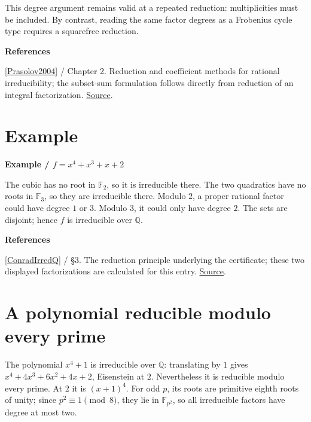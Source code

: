 \documentclass[11pt,a4paper,oneside,openany]{book}
\newcommand{\atlasdisplay}[1]{\par\begingroup\centering\vspace{3pt}\noindent\adjustbox{max width=\linewidth}{\(\displaystyle #1\)}\par\vspace{5pt}\endgroup}
\newenvironment{sources}{\par\smallskip\begingroup\footnotesize\color{atlasgray}\leftskip=10pt\setlength{\parskip}{2pt}}{\par\endgroup\smallskip}
\begin{document}
\color{black} This degree argument remains valid at a repeated reduction: multiplicities must be included. By contrast, reading the same factor degrees as a Frobenius cycle type requires a squarefree reduction.\par
\begin{sources}
\textbf{References}\par\smallskip
\noindent\hyperlink{ref:Prasolov2004}{[Prasolov2004]} / Chapter 2. Reduction and coefficient methods for rational irreducibility; the subset-sum formulation follows directly from reduction of an integral factorization. \href{https://link.springer.com/book/10.1007/978-3-642-03980-5}{Source}.\par
\end{sources}\color{black}
\section{Example}

\begin{atlasblock}[standard]
\textbf{\sffamily Example  /  \(f=x^4+x^3+x+2\)}\par\smallskip


\atlasdisplay{\begin{aligned}f\bmod2&=x(x^3+x^2+1),\\ f\bmod3&=(x^2+1)(x^2+x-1).\end{aligned}}

\color{black} The cubic has no root in \(\mathbb F_2\), so it is irreducible there. The two quadratics have no roots in \(\mathbb F_3\), so they are irreducible there. Modulo \(2\), a proper rational factor could have degree \(1\) or \(3\). Modulo \(3\), it could only have degree \(2\). The sets are disjoint; hence \(f\) is irreducible over \(\mathbb Q\).\par
\end{atlasblock}\color{black}
\begin{sources}
\textbf{References}\par\smallskip
\noindent\hyperlink{ref:ConradIrredQ}{[ConradIrredQ]} / §3. The reduction principle underlying the certificate; these two displayed factorizations are calculated for this entry. \href{https://kconrad.math.uconn.edu/blurbs/ringtheory/irredtestsoverQ.pdf}{Source}.\par
\end{sources}\color{black}
\section{A polynomial reducible modulo every prime}
\color{black} The polynomial \(x^4+1\) is irreducible over \(\mathbb Q\): translating by \(1\) gives \(x^4+4x^3+6x^2+4x+2\), Eisenstein at \(2\). Nevertheless it is reducible modulo every prime. At \(2\) it is \((x+1)^4\). For odd \(p\), its roots are primitive eighth roots of unity; since \(p^2\equiv1\pmod8\), they lie in \(\mathbb F_{p^2}\), so all irreducible factors have degree at most two.\par
\end{document}
